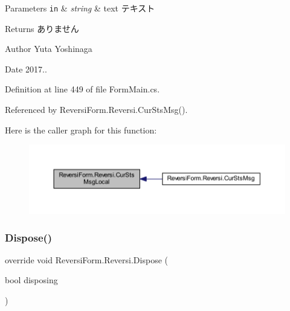\begin{DoxyParams}[1]{Parameters}
\mbox{\tt in}  & {\em string} & text テキスト \\
\hline
\end{DoxyParams}
\begin{DoxyReturn}{Returns}
ありません 
\end{DoxyReturn}
\begin{DoxyAuthor}{Author}
Yuta Yoshinaga 
\end{DoxyAuthor}
\begin{DoxyDate}{Date}
2017.. 
\end{DoxyDate}


Definition at line 449 of file Form\+Main.\+cs.



Referenced by Reversi\+Form.\+Reversi.\+Cur\+Sts\+Msg().

Here is the caller graph for this function\+:
\nopagebreak
\begin{figure}[H]
\begin{center}
\leavevmode
\includegraphics[width=350pt]{class_reversi_form_1_1_reversi_a934897d68f7709c32b6fd126351c5f05_icgraph}
\end{center}
\end{figure}
\mbox{\label{class_reversi_form_1_1_reversi_ac021c14c28e588c11445e460ec7e87d1}} 
\subsubsection{\texorpdfstring{Dispose()}{Dispose()}}
{\footnotesize\ttfamily override void Reversi\+Form.\+Reversi.\+Dispose (\begin{DoxyParamCaption}\item[{bool}]{disposing }\end{DoxyParamCaption})\hspace{0.3cm}{\ttfamily [protected]}}



